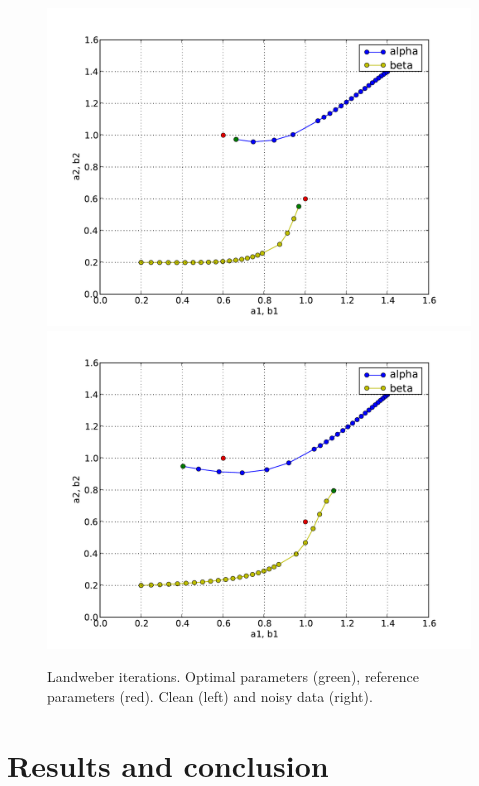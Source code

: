 \begin{figure}
  \centering
  \includegraphics[width=\twofigs]{chapters/schroll/pdf/4D-1scan4b.pdf}
  \includegraphics[width=\twofigs]{chapters/schroll/pdf/4D-1scan4b-5.pdf}
  \caption{Landweber iterations. Optimal parameters (green), reference
    parameters (red). Clean (left) and noisy data (right).}
  \label{fig6}
\end{figure}

\section{Results and conclusion}

